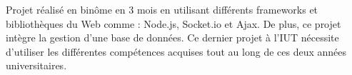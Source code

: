 \documentclass[10pt,a4paper,ragged2e,withhyper]{altacv}
\begin{document}
\begin{paracol}{2}
            
        
            
            
            Projet réalisé en binôme en 3 mois en utilisant différents frameworks et bibliothèques du Web comme : Node.js, Socket.io et Ajax. De plus, ce projet intègre la gestion d'une base de données.  Ce dernier projet à l'IUT nécessite d'utiliser les différentes compétences acquises tout au long de ces deux années universitaires. 
    \end{paracol}
\end{document}
